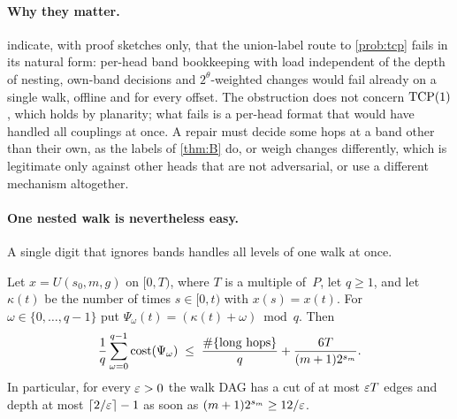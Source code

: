 \paragraph{Why they matter.}  indicate, with proof sketches only, that the union-label
route to \cref{prob:tcp} fails in its natural form: per-head band bookkeeping with load independent of the depth of
nesting, own-band decisions and $2^\theta$-weighted changes would fail already on a single walk, offline and for every
offset. The obstruction does not
concern $\mathrm{TCP}(1)$, which holds by planarity; what fails is a per-head format that would have handled all couplings at
once. A repair must decide some hops at a band other than their own, as the labels of \cref{thm:B} do, or weigh
changes differently, which is legitimate only against other heads that are not adversarial, or use a different
mechanism altogether.

\paragraph{One nested walk is nevertheless easy.} A single digit that ignores bands handles all levels of one walk at
once.

\begin{lemma}\label{lem:dep-visit}
\notformalized
Let $x=U(s_0,m,g)$ on $[0,T)$, where $T$ is a multiple of~$P$, let $q\ge1$, and let $\kappa(t)$ be the number of times
$s\in[0,t)$ with $x(s)=x(t)$. For $\omega\in\{0,\dots,q-1\}$ put $\Psi_\omega(t)=(\kappa(t)+\omega)\bmod q$. Then
\[
  \frac1q\sum_{\omega=0}^{q-1}\mathrm{cost}(\Psi_\omega)\;\le\;\frac{\#\{\text{long hops}\}}q+\frac{6T}{(m+1)2^{s_m}}.
\]
In particular, for every $\varepsilon>0$ the walk DAG has a cut of at most $\varepsilon T$ edges and depth at most
$\lceil2/\varepsilon\rceil-1$ as soon as $(m+1)2^{s_m}\ge12/\varepsilon$.
\end{lemma}


